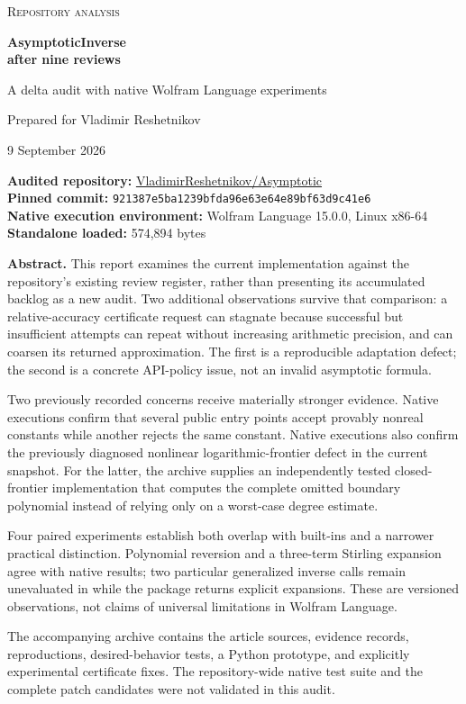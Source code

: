 \documentclass[11pt,letterpaper]{article}
\newcommand{\code}[1]{\texttt{\detokenize{#1}}}
\newcommand{\snapshot}{921387e5ba1239bfda96e63e64e89bf63d9c41e6}
\begin{document}
\begin{titlepage}
\vspace*{0.35in}
{\Large\color{ink}\textsc{Repository analysis}}\par
\vspace{0.2in}
{\Huge\bfseries\color{ink}AsymptoticInverse\\after nine reviews}\par
\vspace{0.2in}
{\Large A delta audit with native Wolfram Language experiments}\par
\vspace{0.3in}
{\large Prepared for Vladimir Reshetnikov}\par
9 September 2026
\vspace{0.28in}
\begin{tcolorbox}
\textbf{Audited repository:} \href{https://github.com/VladimirReshetnikov/Asymptotic}{VladimirReshetnikov/Asymptotic}\\
\textbf{Pinned commit:} {\small\texttt{\snapshot}}\\
\textbf{Native execution environment:} Wolfram Language 15.0.0, Linux x86-64\\
\textbf{Standalone loaded:} 574,894 bytes
\end{tcolorbox}
\vspace{0.13in}
\textbf{Abstract.}
This report examines the current implementation against the repository's existing review register, rather than presenting its accumulated backlog as a new audit. Two additional observations survive that comparison: a relative-accuracy certificate request can stagnate because successful but insufficient attempts can repeat without increasing arithmetic precision, and \code{SeriesRefine} can coarsen its returned approximation. The first is a reproducible adaptation defect; the second is a concrete API-policy issue, not an invalid asymptotic formula.

Two previously recorded concerns receive materially stronger evidence. Native executions confirm that several public entry points accept provably nonreal constants while another rejects the same constant. Native executions also confirm the previously diagnosed nonlinear logarithmic-frontier defect in the current snapshot. For the latter, the archive supplies an independently tested closed-frontier implementation that computes the complete omitted boundary polynomial instead of relying only on a worst-case degree estimate.

Four paired experiments establish both overlap with built-ins and a narrower practical distinction. Polynomial reversion and a three-term Stirling expansion agree with native results; two particular generalized inverse calls remain unevaluated in \code{AsymptoticSolve} while the package returns explicit expansions. These are versioned observations, not claims of universal limitations in Wolfram Language.

The accompanying archive contains the article sources, evidence records, reproductions, desired-behavior tests, a Python prototype, and explicitly experimental certificate fixes. The repository-wide native test suite and the complete patch candidates were not validated in this audit.
\end{titlepage}
\end{document}
